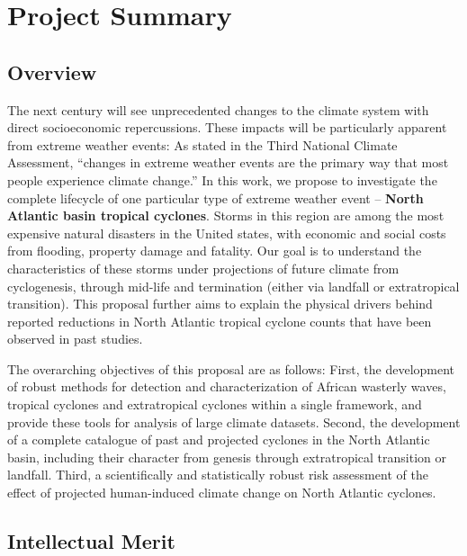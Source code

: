 \documentclass[11pt]{article}
\begin{document}
\appendix

\addtocounter{section}{1}

\section{Project Summary}
\vspace{-0.2cm}

\subsection*{Overview}
\vspace{-0.6cm}

The next century will see unprecedented changes to the climate system with direct socioeconomic repercussions.  These impacts will be particularly apparent from extreme weather events: As stated in the Third National Climate Assessment, ``changes in extreme weather events are the primary way that most people experience climate change.''  In this work, we propose to investigate the complete lifecycle of one particular type of extreme weather event -- \textbf{North Atlantic basin tropical cyclones}.  Storms in this region are among the most expensive natural disasters in the United states, with economic and social costs from flooding, property damage and fatality.  Our goal is to understand the characteristics of these storms under projections of future climate from cyclogenesis, through mid-life and termination (either via landfall or extratropical transition).  This proposal further aims to explain the physical drivers behind reported reductions in North Atlantic tropical cyclone counts that have been observed in past studies.

The overarching objectives of this proposal are as follows:  First, the development of robust methods for detection and characterization of African wasterly waves, tropical cyclones and extratropical cyclones within a single framework, and provide these tools for analysis of large climate datasets.  Second, the development of a complete catalogue of past and projected cyclones in the North Atlantic basin, including their character from genesis through extratropical transition or landfall.  Third, a scientifically and statistically robust risk assessment of the effect of projected human-induced climate change on North Atlantic cyclones.

\vspace{-0.7cm}
\subsection*{Intellectual Merit}
\vspace{-0.6cm}
\end{document}
